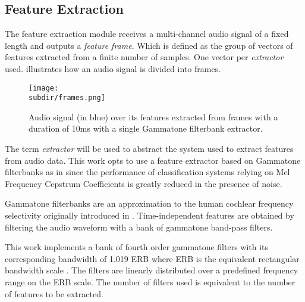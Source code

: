 \subsection{Feature Extraction} \label{subsec:feature-extraction}

The feature extraction module receives a multi-channel audio signal of a fixed
length and outputs a \emph{feature frame}. Which is defined as the group of
vectors of features extracted from a finite number of samples. One vector per
\emph{extractor} used.  illustrates how an audio
signal is divided into frames.

\begin{figure}
    \centering
    \texttt{[image: \\subdir/frames.png]}
    \caption[Audio frames]{Audio signal (in {\color{blue} blue}) over its
        features extracted from frames with a duration of 10ms with a single
        Gammatone filterbank extractor.}
    \label{fig:datasets-frames}
\end{figure}

The term \emph{extractor} will be used to abstract the system used to extract
features from audio data. This work opts to use a feature extractor based on
Gammatone filterbanks as \cite{marchegiani2018a} in since the performance of
classification systems relying on Mel Frequency Cepstrum Coefficients is
greatly reduced in the presence of noise. 

Gammatone filterbanks are an approximation to the human cochlear frequency
selectivity originally introduced in \cite{GTF1998}. Time-independent features
are obtained by filtering the audio waveform with a bank of gammatone band-pass
filters. 

This work implements a bank of fourth order gammatone filters with its
corresponding bandwidth of 1.019 ERB where ERB is the equivalent rectangular
bandwidth scale \cite{GLASBERG1990103}. The filters are linearly distributed
over a predefined frequency range on the ERB scale. The number of filters used
is equivalent to the number of features to be extracted. 